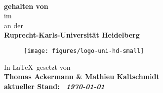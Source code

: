 \begin{titlepage}
	\begin{center}
		\makeatletter
		
		\thispagestyle{empty}
		
		\Huge\textbf{\@title} \\
		\vspace{5mm}
		\Large\textbf{ gehalten von \@author} \\
		\large{im \@date} \\
		\vspace{5mm}
		\large{an der} \\
		\Large\textbf{Ruprecht-Karls-Universität Heidelberg} \\
		\vfill
		\begin{figure}[H]
			\centering
			\texttt{[image: figures/logo-uni-hd-small]}
		\end{figure}
	    \vfill
		\Large
		In \LaTeX \ gesetzt von \\ 
		\vspace{3mm}
		\bfseries{
		Thomas Ackermann
		\& 
		Mathieu Kaltschmidt}\\ 	
	   \vfill
	   \normalfont
	   aktueller Stand: \  \textit{\today}
	   \vfill
		\makeatother
	\end{center}
\blankpage
\end{titlepage}
